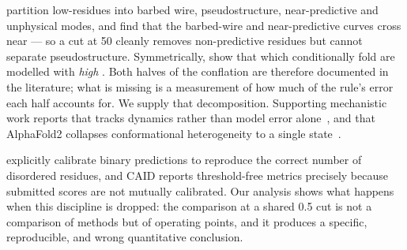  \citet{richardson2025} partition low-\plddt residues
into barbed wire, pseudostructure, near-predictive and unphysical modes, and find that the
barbed-wire and near-predictive curves cross near  --- so a cut at 50 cleanly removes
non-predictive residues but cannot separate pseudostructure. Symmetrically,
\citet{alderson2023} show that \idrs which conditionally fold are modelled with \emph{high}
\plddt. Both halves of the conflation are therefore documented in the literature; what is
missing is a measurement of how much of the rule's error each half accounts for. We supply that
decomposition. Supporting mechanistic work reports that \plddt tracks dynamics rather than model
error alone~\citep{guo2022}, and that AlphaFold2 collapses conformational heterogeneity to a
single state~\citep{chakravarty2022,bhattacharya2022}.

 \citet{kurgan2023} explicitly calibrate
binary predictions to reproduce the correct number of disordered residues, and CAID reports
threshold-free metrics precisely because submitted scores are not mutually calibrated. Our
\cfour analysis shows what happens when this discipline is dropped: the comparison at a shared
0.5 cut is not a comparison of methods but of operating points, and it produces a specific,
reproducible, and wrong quantitative conclusion.
